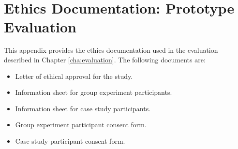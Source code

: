 \chapter{Ethics Documentation: Prototype Evaluation \label{cha:app5}}

This appendix provides the ethics documentation used in the evaluation described 
in Chapter \ref{cha:evaluation}. The following documents are:

\begin{itemize}
  \item Letter of ethical approval for the study.
  \item Information sheet for group experiment participants.
  \item Information sheet for case study participants.
  \item Group experiment participant consent form.
  \item Case study participant consent form.
\end{itemize}








 




